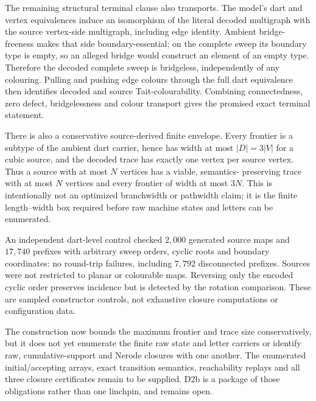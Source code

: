 The remaining structural terminal clause also transports. The model's dart
and vertex equivalences induce an isomorphism of the literal decoded
multigraph with the source vertex-side multigraph, including edge identity.
Ambient bridge-freeness makes that side boundary-essential; on the complete
sweep its boundary type is empty, so an alleged bridge would construct an
element of an empty type. Therefore the decoded complete sweep is bridgeless,
independently of any colouring. Pulling and pushing edge colours through the
full dart equivalence then identifies decoded and source Tait-colourability.
Combining connectedness, zero defect, bridgelessness and colour transport gives
the promised exact terminal statement.

There is also a conservative source-derived finite envelope. Every frontier is
a subtype of the ambient dart carrier, hence has width at most $|D|=3|V|$ for
a cubic source, and the decoded trace has exactly one vertex per source
vertex. Thus a source with at most $N$ vertices has a viable, semantics-
preserving trace with at most $N$ vertices and every frontier of width at most
$3N$. This is intentionally not an optimized branchwidth or pathwidth claim;
it is the finite length--width box required before raw machine states and
letters can be enumerated.

An independent dart-level control checked $2{,}000$ generated source maps
and $17{,}740$ prefixes with arbitrary sweep orders, cyclic roots and boundary
coordinates: no round-trip failures, including $7{,}792$ disconnected
prefixes. Sources were not restricted to planar or colourable maps. Reversing
only the encoded cyclic order preserves incidence but is detected by the
rotation comparison. These are sampled constructor controls, not exhaustive
closure computations or configuration data.

The construction now bounds the maximum frontier and trace size conservatively,
but it does not yet enumerate the finite raw state and letter carriers or
identify raw, cumulative-support and Nerode closures with one another. The
enumerated initial/accepting arrays, exact transition semantics, reachability
replays and all three closure certificates remain to be supplied. D2b is a
package of those obligations rather than one linchpin, and remains open.
